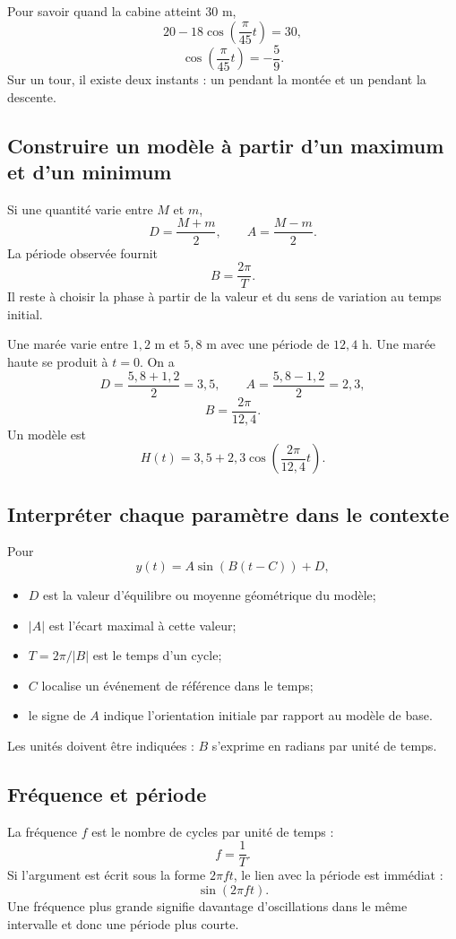 \documentclass[12pt,a4paper,openany]{book}
\newcommand{\abs}[1]{\left\lvert #1\right\rvert}
\begin{document}
Pour savoir quand la cabine atteint $30$ m,
\[
20-18\cos\left(\frac\pi{45}t\right)=30,
\]
\[
\cos\left(\frac\pi{45}t\right)=-\frac59.
\]
Sur un tour, il existe deux instants : un pendant la montée et un pendant la descente.

\subsection{Construire un modèle à partir d'un maximum et d'un minimum}

Si une quantité varie entre $M$ et $m$,
\[
D=\frac{M+m}{2},
\qquad
A=\frac{M-m}{2}.
\]
La période observée fournit
\[
B=\frac{2\pi}{T}.
\]
Il reste à choisir la phase à partir de la valeur et du sens de variation au temps initial.

\begin{examplebox}
Une marée varie entre $1{,}2$ m et $5{,}8$ m avec une période de $12{,}4$ h. Une marée haute se produit à $t=0$. On a
\[
D=\frac{5{,}8+1{,}2}{2}=3{,}5,
\qquad
A=\frac{5{,}8-1{,}2}{2}=2{,}3,
\]
\[
B=\frac{2\pi}{12{,}4}.
\]
Un modèle est
\[
H(t)=3{,}5+2{,}3\cos\left(\frac{2\pi}{12{,}4}t\right).
\]
\end{examplebox}

\subsection{Interpréter chaque paramètre dans le contexte}

Pour
\[
y(t)=A\sin(B(t-C))+D,
\]
\begin{itemize}
\item $D$ est la valeur d'équilibre ou moyenne géométrique du modèle;
\item $\abs A$ est l'écart maximal à cette valeur;
\item $T=2\pi/\abs B$ est le temps d'un cycle;
\item $C$ localise un événement de référence dans le temps;
\item le signe de $A$ indique l'orientation initiale par rapport au modèle de base.
\end{itemize}
Les unités doivent être indiquées : $B$ s'exprime en radians par unité de temps.

\subsection{Fréquence et période}

La fréquence $f$ est le nombre de cycles par unité de temps :
\[
f=\frac1T.
\]
Si l'argument est écrit sous la forme $2\pi ft$, le lien avec la période est immédiat :
\[
\sin(2\pi ft).
\]
Une fréquence plus grande signifie davantage d'oscillations dans le même intervalle et donc une période plus courte.
\end{document}
